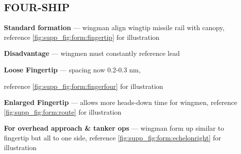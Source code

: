 \subsection{FOUR-SHIP}

\begin{tcoloritemize}
    \blueitem[Fingertip]
    \textbf{Standard formation} --- wingman align wingtip missile rail with canopy,
    reference \cref{fig:supp_fig:form:fingertip} for illustration
    
    \medskip
    \textbf{Disadvantage} --- wingmen must constantly reference lead

    \textbf{Loose Fingertip} --- spacing now 0.2-0.3 nm,

    reference \cref{fig:supp_fig:form:fingerfour} for illustration

    \blueitem[Route]
    \textbf{Enlarged Fingertip} --- allows more heads-down time for wingmen,
    reference \cref{fig:supp_fig:form:route} for illustration

    \textbf{For overhead approach \& tanker ops} --- wingman form up similar to fingertip but all to one side,
    reference \cref{fig:supp_fig:form:echelonright} for illustration
\end{tcoloritemize}

